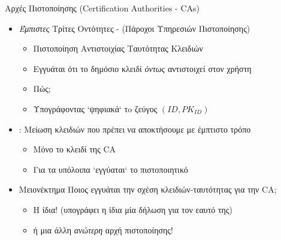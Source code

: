 \documentclass{beamer}
\begin{document}
\begin{frame}{Αρχές Πιστοποίησης (Certification Authorities - CAs)}
    \begin{itemize}
    \item \emph{Έμπιστες} Τρίτες Οντότητες - (Πάροχοι Υπηρεσιών Πιστοποίησης)
    \pause
    \begin{itemize}
        \item Πιστοποίηση Αντιστοιχίας Ταυτότητας Κλειδιών
        \pause
        \item Εγγυάται ότι το δημόσιο κλειδί \emph{όντως} αντιστοιχεί στον χρήστη
        \pause
        \item Πώς;
        \pause 
        \item Υπογράφοντας `ψηφιακά` τo ζεύγος $(ID, PK_{ID})$        
    \end{itemize}
    \pause
    \item {}: Μείωση κλειδιών που πρέπει να αποκτήσουμε με έμπτιστο τρόπο
    \begin{itemize}
        \item Μόνο το κλειδί της CA
        \item Για τα υπόλοιπα `εγγύαται` το πιστοποιητικό
    \end{itemize}
    \item \alert{Μειονέκτημα} Ποιος εγγυάται την σχέση κλειδιών-ταυτότητας για την CA;
    \begin{itemize}
    \pause
    \item Η ίδια! (υπογράφει η ίδια μία δήλωση για τον εαυτό της)
    \pause
    \item ή μια άλλη \emph{ανώτερη} αρχή πιστοποίησης!
    \end{itemize}
    \end{itemize}
\end{frame}
\end{document}
